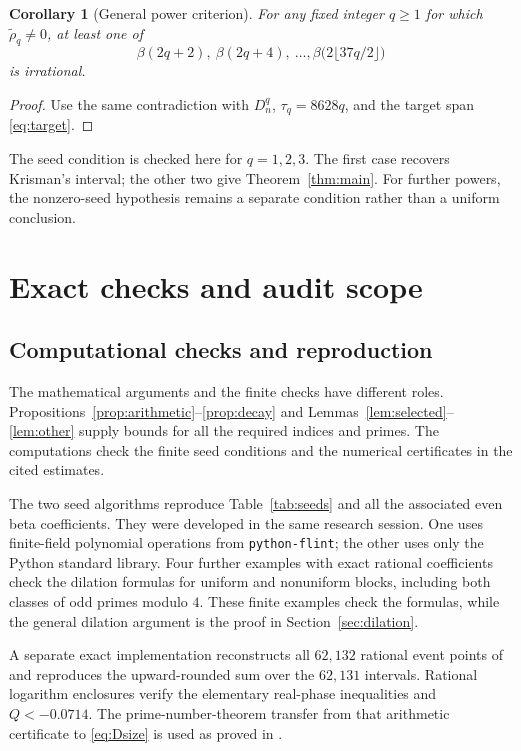 \documentclass[11pt]{article}
\newtheorem{corollary}[theorem]{Corollary}
\begin{document}
\begin{corollary}[General power criterion]\label{cor:general}
For any fixed integer $q\ge1$ for which $\widetilde\rho_q\ne0$, at least
one of
\[
 \beta(2q+2),\ \beta(2q+4),\ \ldots,
 \beta\bigl(2\lfloor37q/2\rfloor\bigr)
\]
is irrational.
\end{corollary}
\begin{proof}
Use the same contradiction with $D_n^q$, $\tau_q=8628q$, and the
target span \eqref{eq:target}.
\end{proof}
The seed condition is checked here for $q=1,2,3$. The first case
recovers Krisman's interval; the other two give Theorem~\ref{thm:main}.
For further powers, the nonzero-seed hypothesis remains a separate
condition rather than a uniform conclusion.

\section{Exact checks and audit scope}\label{sec:audit}
\subsection{Computational checks and reproduction}

The mathematical arguments and the finite checks have different roles.
Propositions~\ref{prop:arithmetic}--\ref{prop:decay} and
Lemmas~\ref{lem:selected}--\ref{lem:other} supply bounds for all the
required indices and primes. The computations check the finite seed
conditions and the numerical certificates in the cited estimates.

The two seed algorithms reproduce Table~\ref{tab:seeds} and all the
associated even beta coefficients. They were developed in the same
research session. One uses finite-field polynomial
operations from \texttt{python-flint}; the other uses only the Python
standard library. Four further examples with exact rational coefficients
check the dilation formulas for uniform and nonuniform blocks, including
both classes of odd primes modulo $4$. These finite examples check the
formulas, while the general dilation argument is the proof in
Section~\ref{sec:dilation}.

A separate exact implementation reconstructs all $62,132$ rational
event points of \cite[Proposition 5.6]{krisman} and reproduces the
upward-rounded sum over the $62,131$ intervals. Rational logarithm
enclosures verify the elementary real-phase inequalities and
$Q<-0.0714$. The prime-number-theorem transfer from that arithmetic
certificate to \eqref{eq:Dsize} is used as proved in
\cite[Proposition 5.8 and Corollary 5.9]{krisman}.
\end{document}
